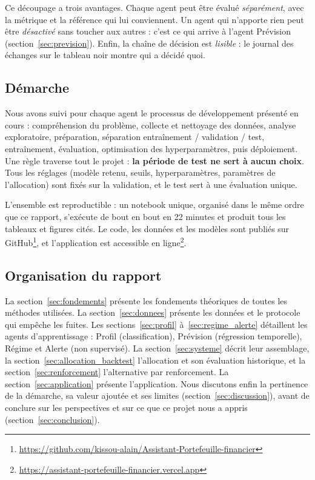 Ce découpage a trois avantages. Chaque agent peut être évalué \emph{séparément}, avec la métrique et la référence qui lui conviennent. Un agent qui n'apporte rien peut être \emph{désactivé} sans toucher aux autres : c'est ce qui arrive à l'agent Prévision (section~\ref{sec:prevision}). Enfin, la chaîne de décision est \emph{lisible} : le journal des échanges sur le tableau noir montre qui a décidé quoi.

\subsection{Démarche}

Nous avons suivi pour chaque agent le processus de développement présenté en cours : compréhension du problème, collecte et nettoyage des données, analyse exploratoire, préparation, séparation entraînement / validation / test, entraînement, évaluation, optimisation des hyperparamètres, puis déploiement. Une règle traverse tout le projet : \textbf{la période de test ne sert à aucun choix}. Tous les réglages (modèle retenu, seuils, hyperparamètres, paramètres de l'allocation) sont fixés sur la validation, et le test sert à une évaluation unique.

L'ensemble est reproductible : un notebook unique, organisé dans le même ordre que ce rapport, s'exécute de bout en bout en 22 minutes et produit tous les tableaux et figures cités. Le code, les données et les modèles sont publiés sur GitHub\footnote{\url{https://github.com/kissou-alain/Assistant-Portefeuille-financier}}, et l'application est accessible en ligne\footnote{\url{https://assistant-portefeuille-financier.vercel.app}}.

\subsection{Organisation du rapport}

La section~\ref{sec:fondements} présente les fondements théoriques de toutes les méthodes utilisées. La section~\ref{sec:donnees} présente les données et le protocole qui empêche les fuites. Les sections~\ref{sec:profil} à~\ref{sec:regime_alerte} détaillent les agents d'apprentissage : Profil (classification), Prévision (régression temporelle), Régime et Alerte (non supervisé). La section~\ref{sec:systeme} décrit leur assemblage, la section~\ref{sec:allocation_backtest} l'allocation et son évaluation historique, et la section~\ref{sec:renforcement} l'alternative par renforcement. La section~\ref{sec:application} présente l'application. Nous discutons enfin la pertinence de la démarche, sa valeur ajoutée et ses limites (section~\ref{sec:discussion}), avant de conclure sur les perspectives et sur ce que ce projet nous a appris (section~\ref{sec:conclusion}).
